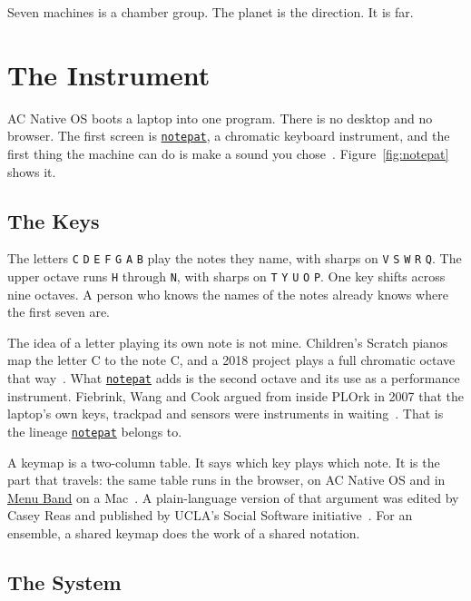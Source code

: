 \documentclass[10pt,letterpaper,twocolumn]{article}
\newcommand{\acos}{AC Native OS}
\newcommand{\np}{\href{https://notepat.com}{\texttt{notepat}}}
\newcommand{\key}[1]{\texttt{#1}}
\begin{document}
Seven machines is a chamber group. The planet is the direction. It is far.


\section{The Instrument}
\label{sec:instrument}

\acos{} boots a laptop into one program. There is no desktop and no browser. The first screen is \np{}, a chromatic keyboard instrument, and the first thing the machine can do is make a sound you chose~\citep{scudder2026os}. Figure~\ref{fig:notepat} shows it.

\subsection{The Keys}

The letters \key{C} \key{D} \key{E} \key{F} \key{G} \key{A} \key{B} play the notes they name, with sharps on \key{V} \key{S} \key{W} \key{R} \key{Q}. The upper octave runs \key{H} through \key{N}, with sharps on \key{T} \key{Y} \key{U} \key{O} \key{P}. One key shifts across nine octaves. A person who knows the names of the notes already knows where the first seven are.

The idea of a letter playing its own note is not mine. Children's Scratch pianos map the letter C to the note C, and a 2018 project plays a full chromatic octave that way~\citep{scudder2026laptop, scudder2026protocols}. What \np{} adds is the second octave and its use as a performance instrument. Fiebrink, Wang and Cook argued from inside PLOrk in 2007 that the laptop's own keys, trackpad and sensors were instruments in waiting~\citep{fiebrink2007laptop}. That is the lineage \np{} belongs to.

A keymap is a two-column table. It says which key plays which note. It is the part that travels: the same table runs in the browser, on \acos{} and in \href{https://prompt.ac/menuband}{Menu Band} on a Mac~\citep{scudder2026keymaps}. A plain-language version of that argument was edited by Casey Reas and published by UCLA's Social Software initiative~\citep{scudder2026keymapscore}. For an ensemble, a shared keymap does the work of a shared notation.

\subsection{The System}
\end{document}
